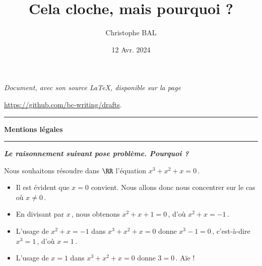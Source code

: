 \documentclass[12pt]{amsart}
\begin{document}
\title{Cela cloche, mais pourquoi ?}
\author{Christophe BAL}
\date{12 Avr. 2024}

\maketitle

\begin{center}
	\itshape
	Document, avec son source \LaTeX, disponible sur la page

	\url{https://github.com/bc-writing/drafts}.
\end{center}


\bigskip


\begin{center}
	\hrule\vspace{.3em}
	{
		\fontsize{1.35em}{1em}\selectfont
		\textbf{Mentions \og légales \fg}
	}

	\vspace{0.45em}
	\doclicenseThis
	\hrule
\end{center}


\bigskip



\begin{tcolorbox}
	\centering
	\itshape\bfseries
	Le raisonnement suivant pose problème. Pourquoi ?
\end{tcolorbox}

Nous souhaitons résoudre dans $\RR$ l'équation $x^3 + x^2 + x = 0$\,.

\begin{itemize}
	\item Il est évident que $x =0$ convient. Nous allons donc nous concentrer sur le cas où $x \neq 0$\,.


	\item En divisant par $x$\,, nous obtenons $x^2 + x + 1 = 0$\,, d'où $x^2 + x = -1$\,.
	
	\item L'usage de $x^2 + x = -1$ dans $x^3 + x^2 + x = 0$ donne $x^3 - 1 = 0$\,, c'est-à-dire $x^3 = 1$\,, d'où $x = 1$\,.
	
	\item L'usage de $x = 1$ dans $x^3 + x^2 + x = 0$ donne $3 = 0$\,. Aïe !
\end{itemize}
\end{document}
